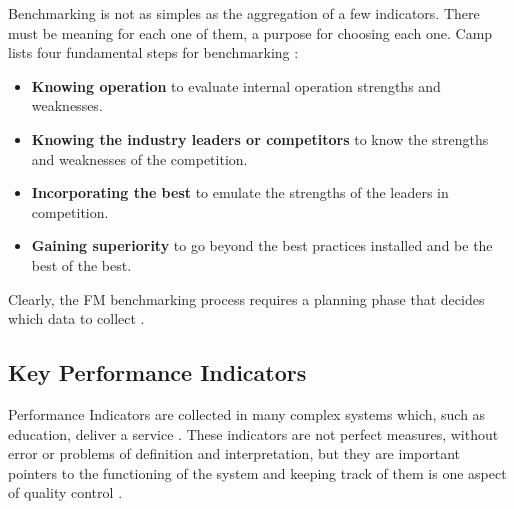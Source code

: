 
Benchmarking is not as simples as the aggregation of a few indicators. There must be meaning for each one of them, a purpose for choosing each one. Camp lists four fundamental steps for benchmarking \cite{Camp1989}:
\begin{itemize}
	\item {\bf Knowing operation} to evaluate internal operation strengths and weaknesses.
	\item {\bf Knowing the industry leaders or competitors} to know the strengths and weaknesses of the competition.
	\item {\bf Incorporating the best} to emulate the strengths of the leaders in competition.
	\item {\bf Gaining superiority} to go beyond the best practices installed and be the best of the best.
\end{itemize}

Clearly, the FM benchmarking process requires a planning phase that decides which data to collect \cite{Gilleard2004}.

\subsection{Key Performance Indicators}

Performance Indicators are collected in many complex systems which, such as education, deliver a service \cite{Fitz-Gibbon1990}. These indicators are not perfect measures, without error or problems of definition and interpretation, but they are important pointers to the functioning of the system and keeping track of them is one aspect of quality control \cite{Fitz-Gibbon1990}.

